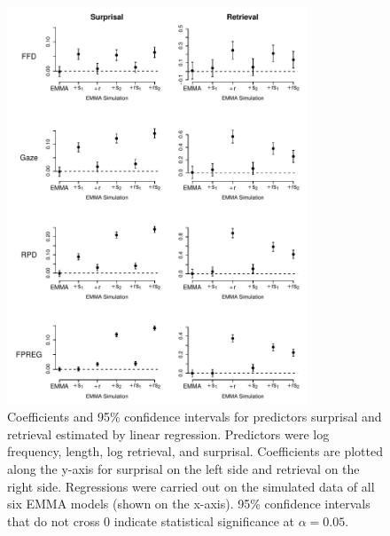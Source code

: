 \documentclass{cambridge7A}\usepackage[]{graphicx}\usepackage[]{color}
\begin{document}
\begin{subappendices}
\begin{figure}[!htbp]
\begin{center}
\includegraphics[width=0.8\textwidth]{figures/fig-lms}
\end{center}
\caption{Coefficients and 95\% confidence intervals for predictors surprisal and retrieval estimated by linear regression.  Predictors were log frequency, length, log retrieval, and surprisal.  Coefficients are plotted along the y-axis for surprisal on the left side and retrieval on the right side. Regressions were carried out on the simulated data of all six EMMA models (shown on the x-axis).  95\% confidence intervals that do not cross 0 indicate statistical significance at $\alpha = 0.05.$}
\label{fig:pred}
\end{figure}


\end{subappendices}
\end{document}
